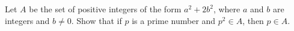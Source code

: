 \documentclass{subfile}
\begin{document}
%		
%		

	\begin{problem} %
		Let $A$ be the set of positive integers of the form $a^2 +2b^2$, where $a$ and $b$ are integers and $b \neq 0$. Show that if $p$ is a prime number and $p^2 \in A$, then $p \in A$.
	\end{problem}

\end{document}
